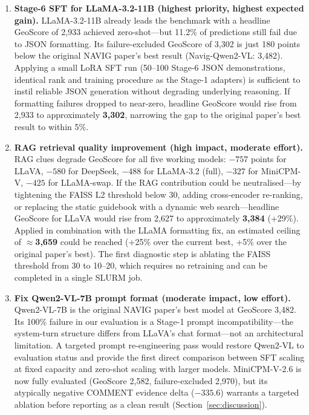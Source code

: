 \documentclass[11pt]{article}
\begin{document}
\begin{enumerate}

  \item \textbf{Stage-6 SFT for LLaMA-3.2-11B (highest priority, highest expected gain).}
    LLaMA-3.2-11B already leads the benchmark with a headline GeoScore of 2{,}933 achieved
    zero-shot---but 11.2\% of predictions still fail due to JSON formatting. Its
    failure-excluded GeoScore of 3{,}302 is just 180 points below the original NAVIG
    paper's best result (Navig-Qwen2-VL: 3{,}482). Applying a small LoRA SFT run
    (50--100 Stage-6 JSON demonstrations, identical rank and training procedure as the
    Stage-1 adapters) is sufficient to instil reliable JSON generation without degrading
    underlying reasoning. If formatting failures dropped to near-zero, headline GeoScore
    would rise from 2{,}933 to approximately \textbf{3{,}302}, narrowing the gap to the
    original paper's best result to within 5\%.

  \item \textbf{RAG retrieval quality improvement (high impact, moderate effort).}
    RAG clues degrade GeoScore for all five working models: $-757$ points for LLaVA,
    $-580$ for DeepSeek, $-488$ for LLaMA-3.2 (full), $-327$ for MiniCPM-V, $-425$ for
    LLaMA-swap. If the RAG contribution could be neutralised---by tightening the FAISS
    L2 threshold below 30, adding cross-encoder re-ranking, or replacing the static
    guidebook with a dynamic web search---headline GeoScore for LLaVA would rise from
    2{,}627 to approximately \textbf{3{,}384} (+29\%). Applied in combination with the
    LLaMA formatting fix, an estimated ceiling of $\approx$\textbf{3{,}659} could be
    reached (+25\% over the current best, +5\% over the original paper's best).
    The first diagnostic step is ablating the FAISS threshold from 30 to 10--20,
    which requires no retraining and can be completed in a single SLURM job.

  \item \textbf{Fix Qwen2-VL-7B prompt format (moderate impact, low effort).}
    Qwen2-VL-7B is the original NAVIG paper's best model at GeoScore 3{,}482. Its 100\%
    failure in our evaluation is a Stage-1 prompt incompatibility---the system-turn
    structure differs from LLaVA's chat format---not an architectural limitation. A
    targeted prompt re-engineering pass would restore Qwen2-VL to evaluation status
    and provide the first direct comparison between SFT scaling at fixed capacity and
    zero-shot scaling with larger models. MiniCPM-V-2.6 is now fully evaluated
    (GeoScore 2{,}582, failure-excluded 2{,}970), but its atypically negative COMMENT
    evidence delta ($-335.6$) warrants a targeted ablation before reporting as a clean
    result (Section~\ref{sec:discussion}).


\end{enumerate}
\end{document}
